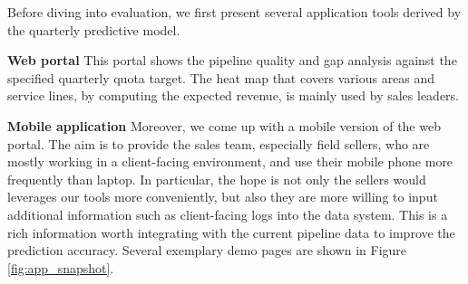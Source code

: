\documentclass[10pt,conference]{IEEEtran}
\begin{document}
Before diving into evaluation, we first present several application tools derived by the quarterly predictive model.

\textbf{Web portal} This portal shows the pipeline quality and gap analysis against the specified quarterly quota target. The heat map that covers various areas and service lines, by computing the expected revenue, is mainly used by sales leaders.

\textbf{Mobile application} Moreover, we come up with a mobile version of the web portal. The aim is to provide the sales team, especially field sellers, who are mostly working in a client-facing environment, and use their mobile phone more frequently than laptop. In particular, the hope is not only the sellers would leverages our tools more conveniently, but also they are more willing to input additional information such as client-facing logs into the data system. This is a rich information worth integrating with the current pipeline data to improve the prediction accuracy. Several exemplary demo pages are shown in Figure \ref{fig:app_snapshot}.
\end{document}

